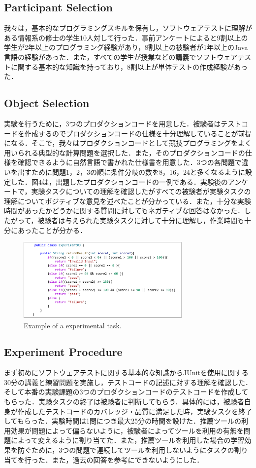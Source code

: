 \documentclass[conference]{IEEEtran}
\begin{document}
\subsection{Participant Selection}
我々は，基本的なプログラミングスキルを保有し，ソフトウェアテストに理解がある情報系の修士の学生10人対して行った．事前アンケートによると9割以上の学生が2年以上のプログラミング経験があり，8割以上の被験者が1年以上のJava言語の経験があった．また，すべての学生が授業などの講義でソフトウェアテストに関する基本的な知識を持っており，8割以上が単体テストの作成経験があった．

\subsection{Object Selection}
実験を行うために，3つのプロダクションコードを用意した．被験者はテストコードを作成するのでプロダクションコードの仕様を十分理解していることが前提になる．そこで，我々はプロダクションコードとして競技プログラミングをよく用いられる典型的な計算問題を選択した．また，そのプロダクションコードの仕様を確認できるように自然言語で書かれた仕様書を用意した．3つの各問題で違いを出すために問題1，2，3の順に条件分岐の数を8，16，24と多くなるように設定した．図4は，出題したプロダクションコードの一例である．実験後のアンケートで，実験タスクについての理解を確認したがすべての被験者が実験タスクの理解についてポジティブな意見を述べたことが分かっている．また，十分な実験時間があったかどうかに関する質問に対してもネガティブな回答はなかった．したがって，被験者は与えられた実験タスクに対して十分に理解し，作業時間も十分にあったことが分かる．

\begin{figure}[htbp]
\centerline{\includegraphics[width=8.5cm]{task.pdf}}
\caption{Example of a experimental task.}
\label{fig3}
\end{figure}

\subsection{Experiment Procedure}
まず初めにソフトウェアテストに関する基本的な知識からJUnitを使用に関する30分の講義と練習問題を実施し，テストコードの記述に対する理解を確認した．そして本番の実験課題の3つのプロダクションコードのテストコードを作成してもらった．実験タスクの終了は被験者に判断してもらう．具体的には，被験者自身が作成したテストコードのカバレッジ・品質に満足した時，実験タスクを終了してもらった．実験時間は1問につき最大25分の時間を設けた．推薦ツールの利用効果が問題によって偏らないように，被験者によってツールを利用の有無を問題によって変えるように割り当てた．また，推薦ツールを利用した場合の学習効果を防ぐために，3つの問題で連続してツールを利用しないようにタスクの割り当てを行った．また，過去の回答を参考にできないようにした．
\end{document}

